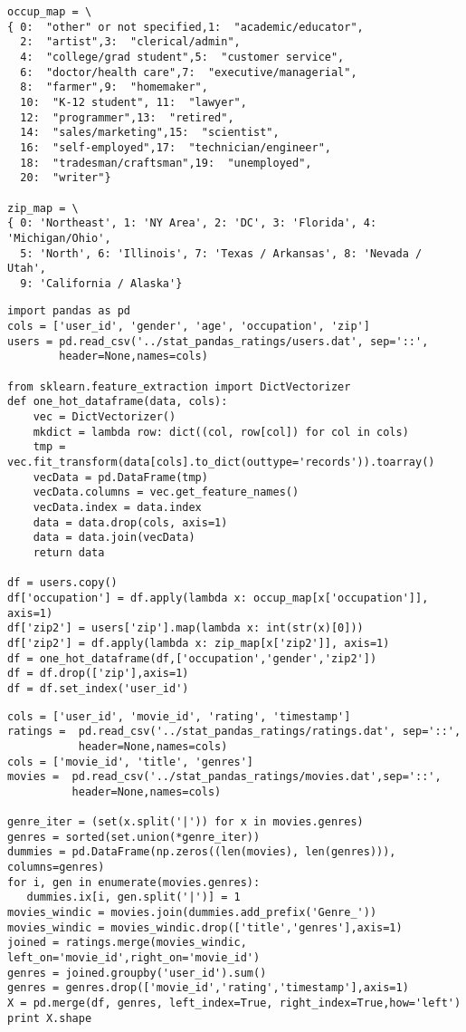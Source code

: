 \documentclass[12pt,fleqn]{article}\usepackage{../common}
\begin{document}
\begin{verbatim}
occup_map = \
{ 0:  "other" or not specified,1:  "academic/educator",
  2:  "artist",3:  "clerical/admin",
  4:  "college/grad student",5:  "customer service",
  6:  "doctor/health care",7:  "executive/managerial",
  8:  "farmer",9:  "homemaker",
  10:  "K-12 student", 11:  "lawyer",
  12:  "programmer",13:  "retired",
  14:  "sales/marketing",15:  "scientist",
  16:  "self-employed",17:  "technician/engineer",
  18:  "tradesman/craftsman",19:  "unemployed",
  20:  "writer"}

zip_map = \
{ 0: 'Northeast', 1: 'NY Area', 2: 'DC', 3: 'Florida', 4: 'Michigan/Ohio', 
  5: 'North', 6: 'Illinois', 7: 'Texas / Arkansas', 8: 'Nevada / Utah', 
  9: 'California / Alaska'}
\end{verbatim}


\begin{verbatim}
import pandas as pd
cols = ['user_id', 'gender', 'age', 'occupation', 'zip']
users = pd.read_csv('../stat_pandas_ratings/users.dat', sep='::', 
        header=None,names=cols)

from sklearn.feature_extraction import DictVectorizer
def one_hot_dataframe(data, cols):
    vec = DictVectorizer()
    mkdict = lambda row: dict((col, row[col]) for col in cols)
    tmp = vec.fit_transform(data[cols].to_dict(outtype='records')).toarray()
    vecData = pd.DataFrame(tmp)
    vecData.columns = vec.get_feature_names()
    vecData.index = data.index
    data = data.drop(cols, axis=1)
    data = data.join(vecData)
    return data

df = users.copy()
df['occupation'] = df.apply(lambda x: occup_map[x['occupation']], axis=1)
df['zip2'] = users['zip'].map(lambda x: int(str(x)[0]))
df['zip2'] = df.apply(lambda x: zip_map[x['zip2']], axis=1)
df = one_hot_dataframe(df,['occupation','gender','zip2'])
df = df.drop(['zip'],axis=1)
df = df.set_index('user_id')
\end{verbatim}



\begin{verbatim}
cols = ['user_id', 'movie_id', 'rating', 'timestamp']
ratings =  pd.read_csv('../stat_pandas_ratings/ratings.dat', sep='::',
           header=None,names=cols)
cols = ['movie_id', 'title', 'genres']
movies =  pd.read_csv('../stat_pandas_ratings/movies.dat',sep='::',
          header=None,names=cols)

genre_iter = (set(x.split('|')) for x in movies.genres)
genres = sorted(set.union(*genre_iter))
dummies = pd.DataFrame(np.zeros((len(movies), len(genres))), columns=genres)
for i, gen in enumerate(movies.genres):
   dummies.ix[i, gen.split('|')] = 1
movies_windic = movies.join(dummies.add_prefix('Genre_'))
movies_windic = movies_windic.drop(['title','genres'],axis=1)
joined = ratings.merge(movies_windic, left_on='movie_id',right_on='movie_id')
genres = joined.groupby('user_id').sum()
genres = genres.drop(['movie_id','rating','timestamp'],axis=1)
X = pd.merge(df, genres, left_index=True, right_index=True,how='left')
print X.shape
\end{verbatim}
\end{document}
